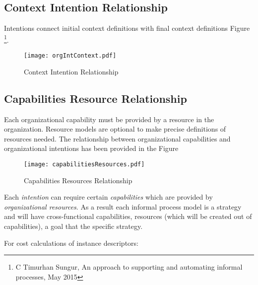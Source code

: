 \subsection{Context Intention Relationship}
\label{sec:ctxintrel}
Intentions connect initial context definitions with final context definitions Figure \footnote{C Timurhan Sungur, An approach to supporting and automating informal processes, May 2015}.


\begin{figure}
	\centering
	\texttt{[image: orgIntContext.pdf]}
	\caption{Context Intention Relationship}
	\label{fig:orgIntentions}
\end{figure}

\subsection{Capabilities Resource Relationship}
\label{sec:capIntRel}
Each organizational capability must be provided by a resource in the organization. Resource models are optional to make precise definitions of resources needed. The relationship between organizational capabilities and organizational intentions has been provided in the Figure 
 
\begin{figure}
	\centering
	\texttt{[image: capabilitiesResources.pdf]}
	\caption{Capabilities Resources Relationship}
	\label{fig:capabilitiesresources}
\end{figure}

Each \textit{intention} can require certain \textit{capabilities} which are provided by \textit{organizational resources}. 
As a result each informal process model is a strategy and will have cross-functional capabilities, resources (which will be created out of capabilities), a goal that the specific strategy.

For cost calculations of instance descriptors:

